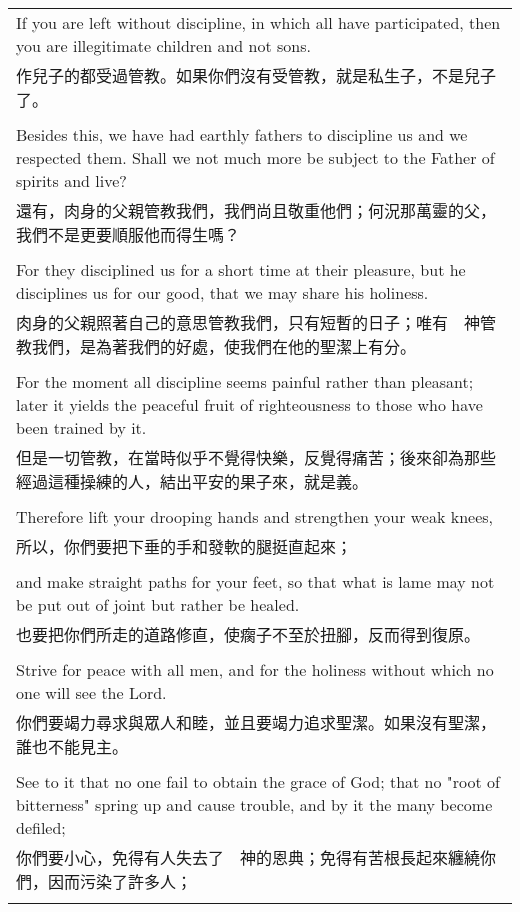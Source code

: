 \documentclass{book}
\begin{document}
\begin{tabularx}{\textwidth}{p{}}
If you are left without discipline, in which all have participated, then you are illegitimate children and not sons. \\
作兒子的都受過管教。如果你們沒有受管教，就是私生子，不是兒子了。 \\ \\
Besides this, we have had earthly fathers to discipline us and we respected them. Shall we not much more be subject to the Father of spirits and live? \\
還有，肉身的父親管教我們，我們尚且敬重他們；何況那萬靈的父，我們不是更要順服他而得生嗎？ \\ \\
For they disciplined us for a short time at their pleasure, but he disciplines us for our good, that we may share his holiness. \\
肉身的父親照著自己的意思管教我們，只有短暫的日子；唯有　神管教我們，是為著我們的好處，使我們在他的聖潔上有分。 \\ \\
For the moment all discipline seems painful rather than pleasant; later it yields the peaceful fruit of righteousness to those who have been trained by it. \\
但是一切管教，在當時似乎不覺得快樂，反覺得痛苦；後來卻為那些經過這種操練的人，結出平安的果子來，就是義。 \\ \\
Therefore lift your drooping hands and strengthen your weak knees, \\
所以，你們要把下垂的手和發軟的腿挺直起來； \\ \\
and make straight paths for your feet, so that what is lame may not be put out of joint but rather be healed. \\
也要把你們所走的道路修直，使瘸子不至於扭腳，反而得到復原。 \\ \\
Strive for peace with all men, and for the holiness without which no one will see the Lord. \\
你們要竭力尋求與眾人和睦，並且要竭力追求聖潔。如果沒有聖潔，誰也不能見主。 \\ \\
See to it that no one fail to obtain the grace of God; that no "root of bitterness" spring up and cause trouble, and by it the many become defiled; \\
你們要小心，免得有人失去了　神的恩典；免得有苦根長起來纏繞你們，因而污染了許多人； \\ \\

\end{tabularx}
\end{document}

